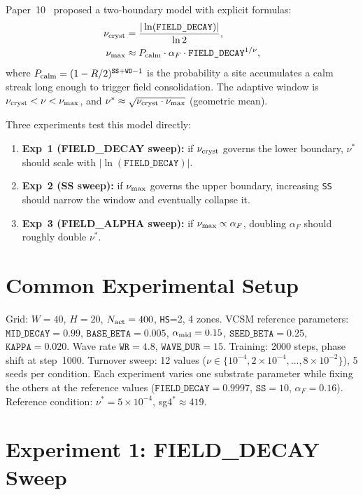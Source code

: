\documentclass[11pt]{article}
\begin{document}
Paper~10~\cite{paper10} proposed a two-boundary model with explicit formulas:
\begin{align}
  \nu_{\rm cryst} &= \frac{|\ln(\texttt{FIELD\_DECAY})|}{\ln 2},
  \label{eq:nucryst} \\
  \nu_{\rm max}   &\approx P_{\rm calm} \cdot \alpha_F \cdot \texttt{FIELD\_DECAY}^{1/\nu},
  \label{eq:numax}
\end{align}
where $P_{\rm calm} = (1-R/2)^{\texttt{SS}+\texttt{WD}-1}$ is the probability
a site accumulates a calm streak long enough to trigger field consolidation.
The adaptive window is $\nu_{\rm cryst} < \nu < \nu_{\rm max}$, and
$\nu^* \approx \sqrt{\nu_{\rm cryst} \cdot \nu_{\rm max}}$ (geometric mean).

Three experiments test this model directly:
\begin{enumerate}
  \item \textbf{Exp~1 (FIELD\_DECAY sweep):} if $\nu_{\rm cryst}$ governs the lower
    boundary, $\nu^*$ should scale with $|\ln(\texttt{FIELD\_DECAY})|$.
  \item \textbf{Exp~2 (SS sweep):} if $\nu_{\rm max}$ governs the upper boundary,
    increasing \texttt{SS} should narrow the window and eventually collapse it.
  \item \textbf{Exp~3 (FIELD\_ALPHA sweep):} if $\nu_{\rm max} \propto \alpha_F$,
    doubling $\alpha_F$ should roughly double $\nu^*$.
\end{enumerate}

\section{Common Experimental Setup}

Grid: $W=40$, $H=20$, $N_{\rm act}=400$, \texttt{HS}=2, 4 zones.
VCSM reference parameters: $\texttt{MID\_DECAY}=0.99$,
$\texttt{BASE\_BETA}=0.005$, $\alpha_{\rm mid}=0.15$,
$\texttt{SEED\_BETA}=0.25$, $\texttt{KAPPA}=0.020$.
Wave rate $\texttt{WR}=4.8$, $\texttt{WAVE\_DUR}=15$.
Training: 2000 steps, phase shift at step~1000.
Turnover sweep: 12 values
($\nu \in \{10^{-4}, 2\times10^{-4}, \ldots, 8\times10^{-2}\}$),
5 seeds per condition.
Each experiment varies one substrate parameter while fixing the others at the
reference values ($\texttt{FIELD\_DECAY}=0.9997$, $\texttt{SS}=10$,
$\alpha_F=0.16$).
Reference condition: $\nu^*=5\times10^{-4}$, sg4$^*\approx419$.

\section{Experiment 1: FIELD\_DECAY Sweep}
\end{document}
